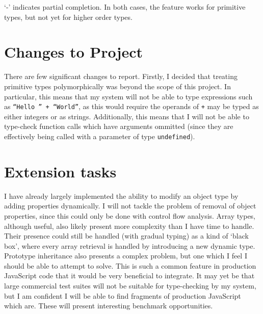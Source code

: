 \documentclass{article}
\begin{document}
	`-' indicates partial completion. In both cases, the feature works for
	primitive types, but not yet for higher order types.

	\section{Changes to Project}

		There are few significant changes to report. Firstly, I decided that
		treating primitive types polymorphically was beyond the scope of this
		project. In particular, this means that my system will not be able to
		type expressions such as \texttt{``Hello '' + ``World''}, as this
		would require the operands of \texttt{+} may be typed as either
		integers or as strings. Additionally, this means that I will not be
		able to type-check function calls which have arguments ommitted (since
		they are effectively being called with a parameter of type
		\texttt{undefined}).

	\section{Extension tasks}

		I have already largely implemented the ability to modify an object
		type by adding properties dynamically. I will not tackle the problem
		of removal of object properties, since this could only be done with
		control flow analysis. Array types, although useful, also likely
		present more complexity than I have time to handle. Their presence
		could still be handled (with gradual typing) as a kind of `black box',
		where every array retrieval is handled by introducing a new dynamic
		type. Prototype inheritance also presents a complex problem, but one
		which I feel I should be able to attempt to solve. This is such a
		common feature in production JavaScript code that it would be very
		beneficial to integrate. It may yet be that large commercial test
		suites will not be suitable for type-checking by my system, but I am
		confident I will be able to find fragments of production JavaScript
		which are. These will present interesting benchmark opportunities.
\end{document}
